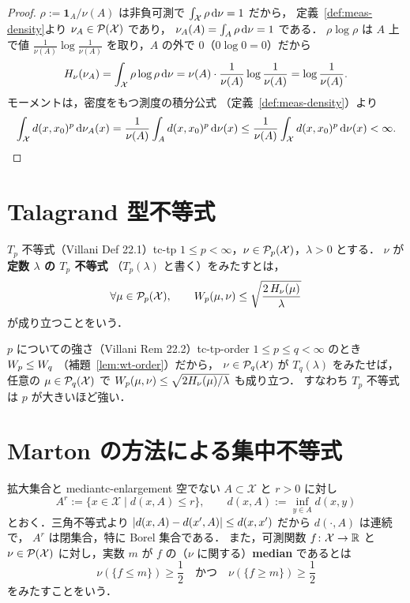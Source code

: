 \begin{proof}
  $\rho:=\mathbf{1}_A/\nu(A)$ は非負可測で
  $\int_{\mathcal{X}}\rho\,\mathrm{d}\nu=1$ だから，
  定義~\ref{def:meas-density}より $\nu_A\in\mathcal{P}(\mathcal{X})$ であり，
  $\nu_A(A)=\int_A\rho\,\mathrm{d}\nu=1$ である．
  $\rho\log\rho$ は $A$ 上で値
  $\frac{1}{\nu(A)}\log\frac{1}{\nu(A)}$ を取り，$A$ の外で
  $0$（$0\log0=0$）だから
  \[
    H_\nu(\nu_A)
    =\int_{\mathcal{X}}\rho\log\rho\,\mathrm{d}\nu
    =\nu(A)\cdot\frac{1}{\nu(A)}\log\frac{1}{\nu(A)}
    =\log\frac{1}{\nu(A)}.
  \]
  モーメントは，密度をもつ測度の積分公式
  （定義~\ref{def:meas-density}）より
  \[
    \int_{\mathcal{X}}d(x,x_0)^p\,\mathrm{d}\nu_A(x)
    =\frac{1}{\nu(A)}\int_Ad(x,x_0)^p\,\mathrm{d}\nu(x)
    \leq\frac{1}{\nu(A)}\int_{\mathcal{X}}d(x,x_0)^p\,\mathrm{d}\nu(x)
    <\infty.  \qedhere
  \]
\end{proof}

\section{Talagrand 型不等式}
\label{sec:tc-tp}

\begin{definition}{$T_p$ 不等式（Villani Def 22.1）}{tc-tp}
  $1\leq p<\infty$，$\nu\in\mathcal{P}_{p}(\mathcal{X})$，$\lambda>0$ とする．
  $\nu$ が\textbf{定数 $\lambda$ の $T_p$ 不等式}
  （$T_p(\lambda)$ と書く）をみたすとは，
  \[
    \forall\mu\in\mathcal{P}_{p}(\mathcal{X}),\qquad
    W_p(\mu,\nu)\leq\sqrt{\frac{2\,H_\nu(\mu)}{\lambda}}
  \]
  が成り立つことをいう．
\end{definition}

\begin{remark}{$p$ についての強さ（Villani Rem 22.2）}{tc-tp-order}
  $1\leq p\leq q<\infty$ のとき $W_p\leq W_q$
  （補題~\ref{lem:wt-order}）だから，
  $\nu\in\mathcal{P}_{q}(\mathcal{X})$ が $T_q(\lambda)$ をみたせば，
  任意の $\mu\in\mathcal{P}_{q}(\mathcal{X})$ で
  $W_p(\mu,\nu)\leq\sqrt{2H_\nu(\mu)/\lambda}$ も成り立つ．
  すなわち $T_p$ 不等式は $p$ が大きいほど強い．
\end{remark}

\section{Marton の方法による集中不等式}
\label{sec:tc-concentration}

\begin{definition}{拡大集合と median}{tc-enlargement}
  空でない $A\subset\mathcal{X}$ と $r>0$ に対し
  \[
    A^r:=\{x\in\mathcal{X}\mid d(x,A)\leq r\},
    \qquad
    d(x,A):=\inf_{y\in A}d(x,y)
  \]
  とおく．三角不等式より
  $\lvert d(x,A)-d(x',A) \rvert\leq d(x,x')$ だから $d(\cdot,A)$ は連続で，
  $A^r$ は閉集合，特に Borel 集合である．
  また，可測関数 $f\colon\mathcal{X}\to\mathbb{R}$ と
  $\nu\in\mathcal{P}(\mathcal{X})$ に対し，実数 $m$ が
  $f$ の（$\nu$ に関する）\textbf{median} であるとは
  \[
    \nu(\{f\leq m\})\geq\frac12
    \quad\text{かつ}\quad
    \nu(\{f\geq m\})\geq\frac12
  \]
  をみたすことをいう．
\end{definition}

